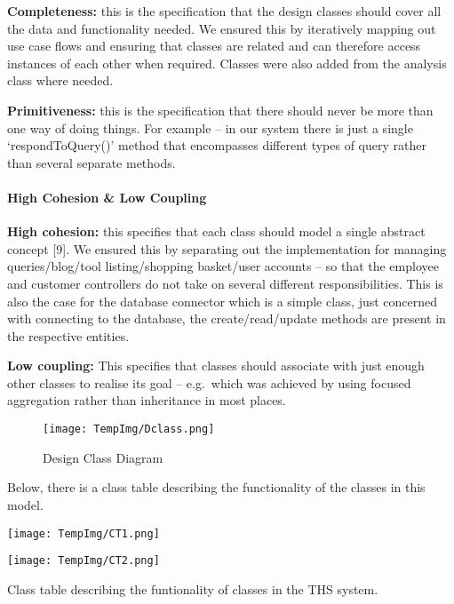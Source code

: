 \documentclass[fontsize=11pt]{extarticle}
\numberwithin{figure}{section} %
\numberwithin{table}{section}%
\let\oldparagraph\paragraph
\renewcommand{\paragraph}[1]{\oldparagraph{#1}\mbox{}}
\begin{document}
\textbf{Completeness: } this is the specification that the design
classes should cover all the data and functionality needed. We ensured
this by iteratively mapping out use case flows and ensuring that classes
are related and can therefore access instances of each other when
required. Classes were also added from the analysis class where needed.

\textbf{Primitiveness:} this is the specification that there should
never be more than one way of doing things. For example -- in our system
there is just a single `respondToQuery()' method that encompasses
different types of query rather than several separate methods.

\hypertarget{high-cohesion-low-coupling}{%
\paragraph{High Cohesion \& Low
Coupling}\label{high-cohesion-low-coupling}}

\textbf{High cohesion: } this specifies that each class should model a
single abstract concept {[}9{]}. We ensured this by separating out the
implementation for managing queries/blog/tool listing/shopping
basket/user accounts -- so that the employee and customer controllers do
not take on several different responsibilities. This is also the case
for the database connector which is a simple class, just concerned with
connecting to the database, the create/read/update methods are present
in the respective entities.

\textbf{Low coupling: }This specifies that classes should associate with
just enough other classes to realise its goal -- e.g.~which was achieved
by using focused aggregation rather than inheritance in most places.

\begin{figure}[H]
      \centering
      \texttt{[image: TempImg/Dclass.png]}
      \caption{Design Class Diagram}
 \end{figure}

Below, there is a class table describing the functionality of the
classes in this model.

\begin{table}[H]
      \centering
      \texttt{[image: TempImg/CT1.png]}
\end{table}

\begin{table}[H]
      \centering
      \texttt{[image: TempImg/CT2.png]}
      \caption{Class table describing the funtionality of classes in the THS system.}
\end{table}
\end{document}
